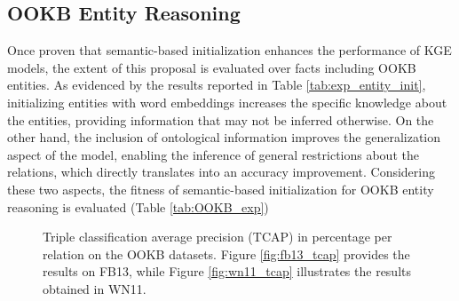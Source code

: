 \subsection{OOKB Entity Reasoning}
Once proven that semantic-based initialization enhances the performance of KGE models, the extent of this proposal is evaluated over facts including OOKB entities. As evidenced by the results reported in Table \ref{tab:exp_entity_init}, initializing entities with word embeddings increases the specific knowledge about the entities, providing information that may not be inferred otherwise. On the other hand, the inclusion of ontological information improves the generalization aspect of the model, enabling the inference of general restrictions about the relations, which directly translates into an accuracy improvement. Considering these two aspects, the fitness of semantic-based initialization for OOKB entity reasoning is evaluated (Table \ref{tab:OOKB_exp})

\begin{figure}[t!]
    \centering
    \caption{Triple classification average precision (TCAP) in percentage per relation on the OOKB datasets. Figure \ref{fig:fb13_tcap} provides the results on FB13, while Figure \ref{fig:wn11_tcap} illustrates the results obtained in WN11.}
    \label{fig:tcap_OOKB}
\end{figure}

